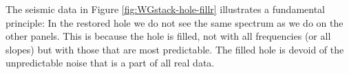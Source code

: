 \par
The seismic data in
Figure \ref{fig:WGstack-hole-fillr}
illustrates a fundamental principle:
In the restored hole we do not see the same spectrum
as we do on the other panels.
This is because the hole is filled,
not with all frequencies (or all slopes) but with those
that are most predictable.
The filled hole is devoid of the unpredictable noise
that is a part of all real data.




